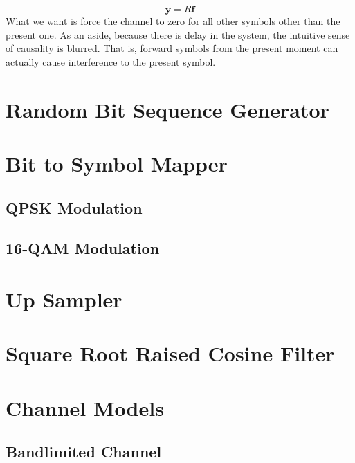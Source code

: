 \documentclass[]{article}
\begin{document}
\begin{equation}
\label{eq:equalizerMatrix}
\mathbf{y} = R\mathbf{f}
\end{equation}
What we want is force the channel to zero for all other symbols other than the present one.  As an aside, because there is delay in the system, the intuitive sense of causality is blurred. That is, forward symbols from the present moment can actually cause interference to the present symbol. 

\section{Random Bit Sequence Generator}
\label{app:random_bit_generator}


\section{Bit to Symbol Mapper}
\label{app:bittosym}

\subsection{QPSK Modulation}
\label{app:qpsk_mod}


\subsection{16-QAM Modulation}
\label{app:qam_16_mod}


\section{Up Sampler}
\label{app:impulse_train}


\section{Square Root Raised Cosine Filter}
\label{app:sqrt_raised_cosine}


\section{Channel Models}
\subsection{Bandlimited Channel}
\label{app:bandlimited}

\end{document}

